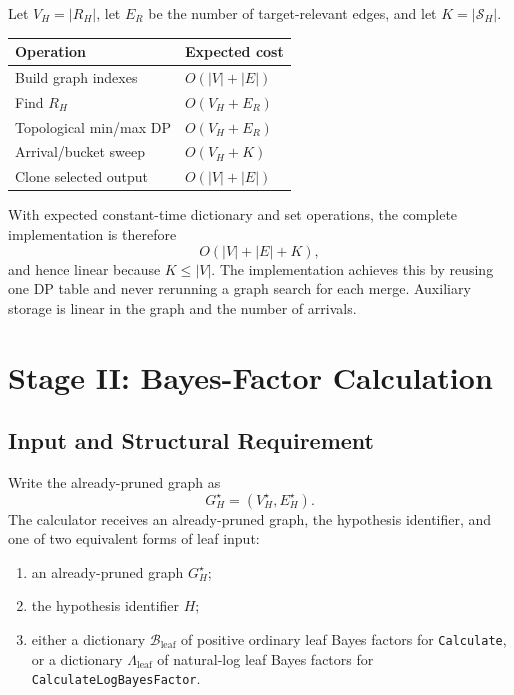 \documentclass[11pt]{article}
\begin{document}
Let \(V_H=|R_H|\), let \(E_R\) be the number of target-relevant edges, and let
\(K=|\mathcal{S}_H|\).

\begin{center}
\begin{tabular}{ll}
\toprule
Operation & Expected cost \\
\midrule
Build graph indexes & \(O(|V|+|E|)\) \\
Find \(R_H\) & \(O(V_H+E_R)\) \\
Topological min/max DP & \(O(V_H+E_R)\) \\
Arrival/bucket sweep & \(O(V_H+K)\) \\
Clone selected output & \(O(|V|+|E|)\) \\
\bottomrule
\end{tabular}
\end{center}

With expected constant-time dictionary and set operations, the complete
implementation is therefore
\[
    O(|V|+|E|+K),
\]
and hence linear because \(K\leq |V|\).  The implementation achieves this by
reusing one DP table and never rerunning a graph search for each merge.
Auxiliary storage is linear in the graph and the number of arrivals.

\section{Stage II: Bayes-Factor Calculation}

\subsection{Input and Structural Requirement}

Write the already-pruned graph as
\[
    G_H^{\star}=(V_H^{\star},E_H^{\star}).
\]
The calculator receives an already-pruned graph, the hypothesis identifier,
and one of two equivalent forms of leaf input:

\begin{enumerate}
    \item an already-pruned graph \(G_H^{\star}\);
    \item the hypothesis identifier \(H\);
    \item either a dictionary \(\mathcal{B}_{\mathrm{leaf}}\) of positive
          ordinary leaf Bayes factors for \texttt{Calculate}, or a dictionary
          \(\Lambda_{\mathrm{leaf}}\) of natural-log leaf Bayes factors for
          \texttt{CalculateLogBayesFactor}.
\end{enumerate}
\end{document}
